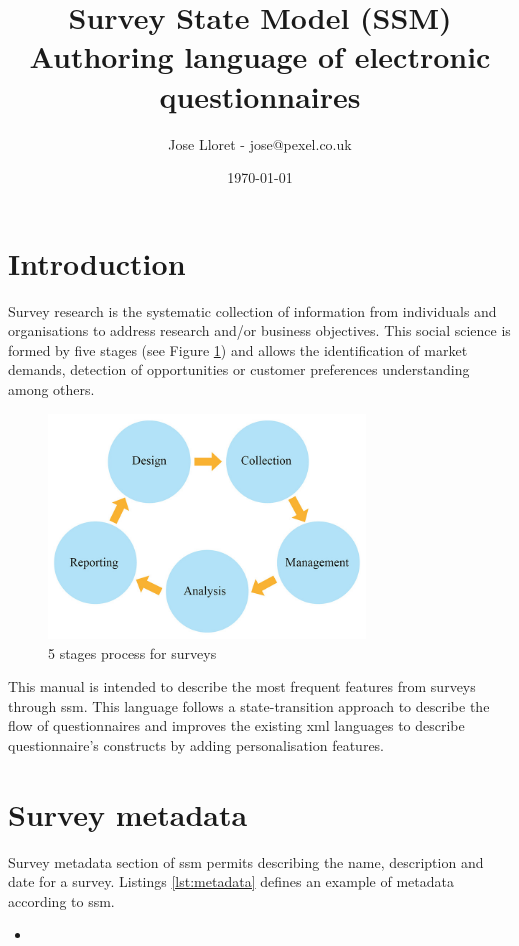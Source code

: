 \documentclass{article}
\title{Survey State Model (SSM)\\ Authoring language of electronic questionnaires} %
\author{Jose Lloret - jose@pexel.co.uk} %
\date{\today} %
\newcommand{\insertcode}[3]{\begin{itemize}\item[]\end{itemize}} %
\begin{document}
\maketitle


\section{Introduction}
Survey research is the systematic collection of information from individuals and organisations to address research and/or business objectives. This social science is formed by five stages (see Figure \ref{fig:5stage}) and allows the identification of market demands, detection of opportunities or customer preferences understanding among others.
\begin{figure}[h!]
\label{fig:5stage}
\centering
\includegraphics[width=0.75\textwidth]{img/5stage}
\caption{5 stages process for surveys}
\end{figure}
This manual is intended to describe the most frequent features from surveys through \gls{ssm}. This language follows a state-transition approach to describe the flow of questionnaires and improves the existing \gls{xml} languages to describe questionnaire's constructs by adding personalisation features.
\section{Survey metadata}
Survey metadata section of \gls{ssm} permits describing the name, description and date for a survey. Listings \ref{lst:metadata} defines an example of metadata according to \gls{ssm}.
\insertcode{"scripts/metadata.xml"}{Metadata for surveys}{lst:metadata}
\end{document}
